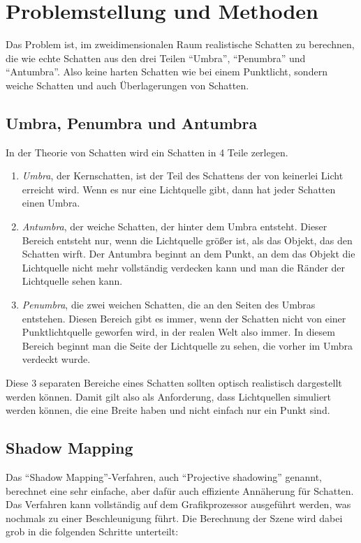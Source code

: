 \section{Problemstellung und Methoden}

Das Problem ist, im zweidimensionalen Raum realistische Schatten zu berechnen, die wie echte
Schatten aus den drei Teilen "`Umbra"', "`Penumbra"' und "`Antumbra"'.
Also keine harten Schatten wie bei einem Punktlicht, sondern weiche Schatten und auch
Überlagerungen von Schatten.

\subsection{Umbra, Penumbra und Antumbra}

In der Theorie von Schatten wird ein Schatten in 4 Teile zerlegen.
\begin{enumerate}
 \item \emph{Umbra}, der Kernschatten, ist der Teil des Schattens der von keinerlei Licht erreicht wird.
       Wenn es nur eine Lichtquelle gibt, dann hat jeder Schatten einen Umbra.
 \item \emph{Antumbra}, der weiche Schatten, der hinter dem Umbra entsteht. Dieser Bereich entsteht nur,
       wenn die Lichtquelle größer ist, als das Objekt, das den Schatten wirft. Der Antumbra beginnt an
       dem Punkt, an dem das Objekt die Lichtquelle nicht mehr vollständig verdecken kann und man die
       Ränder der Lichtquelle sehen kann.
 \item \emph{Penumbra}, die zwei weichen Schatten, die an den Seiten des Umbras entstehen. Diesen Bereich
       gibt es immer, wenn der Schatten nicht von einer Punktlichtquelle geworfen wird, in der realen
       Welt also immer. In diesem Bereich beginnt man die Seite der Lichtquelle zu sehen, die vorher im
       Umbra verdeckt wurde.
\end{enumerate}
Diese 3 separaten Bereiche eines Schatten sollten optisch realistisch dargestellt werden können.
Damit gilt also als Anforderung, dass Lichtquellen simuliert werden können, die eine Breite haben
und nicht einfach nur ein Punkt sind.


\subsection{Shadow Mapping}

Das "`Shadow Mapping"'-Verfahren, auch "`Projective shadowing"' genannt, berechnet eine sehr einfache,
aber dafür auch effiziente Annäherung für Schatten. Das Verfahren kann vollständig auf dem
Grafikprozessor ausgeführt werden, was nochmals zu einer Beschleunigung führt. Die Berechnung der
Szene wird dabei grob in die folgenden Schritte unterteilt:

